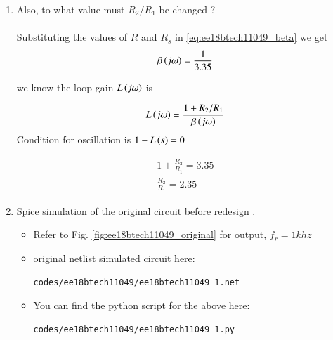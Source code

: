 \begin{enumerate}[label=\arabic*.,ref=\theenumi]
\item Also, to what value must $R_2/R_1$ be changed ?
\\
\\
\solution Substituting the values of $R $ and $ R_s$ in \ref{eq:ee18btech11049_beta} we get
\begin{align}
    \beta\left(j\omega\right) = \frac{1}{3.35}
\end{align}
%

we know the loop gain $L\left(j\omega\right)$ is


\begin{align}
    L\left(j\omega\right) = \frac{1+R_2/R_1}{\beta \left(j\omega\right)}
\end{align}
Condition for oscillation is $1-L\left(s\right) = 0$

\begin{align}
    1 + \frac{R_2}{R_1} = 3.35 \\
    \frac{R_2}{R_1} = 2.35
\end{align}


\item Spice simulation of the original circuit before redesign . 
\\

\solution 

\begin{itemize}
\item Refer to Fig. \ref{fig:ee18btech11049_original}
 for output, $f_r = 1 khz $
\item original netlist simulated circuit here:
\begin{lstlisting}
codes/ee18btech11049/ee18btech11049_1.net
\end{lstlisting}
\item You can find the python script for the above here:
\begin{lstlisting}
codes/ee18btech11049/ee18btech11049_1.py
\end{lstlisting}
\end{itemize}


\end{enumerate}

